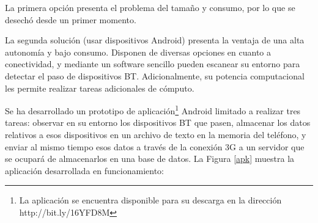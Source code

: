 \documentclass[twocolumn,twoside]{Jornadas}
\begin{document}
La primera opción presenta el problema del tamaño y consumo, por lo que se desechó desde un primer momento.

La segunda solución (usar dispositivos Android) presenta la ventaja de una alta autonomía y bajo consumo. Disponen de diversas opciones en cuanto a conectividad, y mediante un software sencillo pueden escanear su entorno para detectar el paso de dispositivos BT. Adicionalmente, su potencia computacional les permite realizar tareas adicionales de cómputo.

Se ha desarrollado un prototipo de aplicación\footnote{La aplicación se encuentra disponible para su descarga en la dirección http://bit.ly/16YFD8M} 
Android limitado a realizar tres tareas: observar en su entorno los dispositivos BT que pasen, almacenar los datos relativos a esos dispositivos en un archivo de texto en la memoria del teléfono, y enviar al mismo tiempo esos datos a través de la conexión 3G a un servidor que se ocupará de almacenarlos en una base de datos. 
La Figura \ref{apk} muestra la aplicación desarrollada en funcionamiento:
\end{document}
